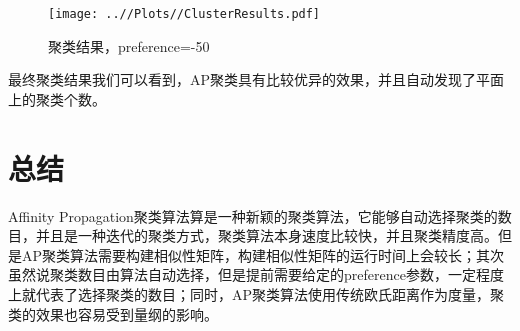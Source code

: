 \documentclass[UTF8, 12pt]{ctexart}
\begin{document}
\begin{figure}[H]
	\centering
	\texttt{[image: ..//Plots//ClusterResults.pdf]}
	\caption{聚类结果，preference=-50}
	\label{Fig:4}
	\vspace{-0.5em}
\end{figure}
最终聚类结果我们可以看到，AP聚类具有比较优异的效果，并且自动发现了平面上的聚类个数。

\section{总结}
Affinity Propagation聚类算法算是一种新颖的聚类算法，它能够自动选择聚类的数目，并且是一种迭代的聚类方式，聚类算法本身速度比较快，并且聚类精度高\cite{frey2007clustering}。但是AP聚类算法需要构建相似性矩阵，构建相似性矩阵的运行时间上会较长；其次虽然说聚类数目由算法自动选择，但是提前需要给定的preference参数，一定程度上就代表了选择聚类的数目；同时，AP聚类算法使用传统欧氏距离作为度量，聚类的效果也容易受到量纲的影响\cite{唐丹2017改进的近邻传播聚类算法及其应用研究}。

  
  
\end{document}
